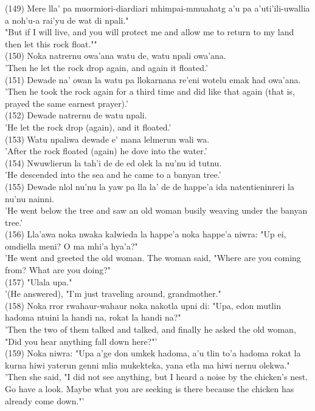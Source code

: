 \documentclass[10pt]{article}
\begin{document}
(149) Mere lla' pa muormiori-diardiari mhimpai-mmuahatg a'u pa a'uti'ili-uwallia a noh'u-a rai'yu de wat di npali."\\
"But if I will live, and you will protect me and allow me to return to my land then let this rock float.""\\
(150) Noka natrernu owa'ana watu de, watu npali owa'ana.\\
'Then he let the rock drop again, and again it floated.'\\
(151) Dewade na' owan la watu pa llokarnana re'eni wotelu emak had owa'ana.\\
'Then he took the rock again for a third time and did like that again (that is, prayed the same earnest prayer).'\\
(152) Dewade natrernu de watu npali.\\
'He let the rock drop (again), and it floated.'\\
(153) Watu npaliwa dewade e' mana lelmerun wali wa.\\
'After the rock floated (again) he dove into the water.'\\
(154) Nwuwlierun la tah'i de de ed olek la nu'nu id tutnu.\\
'He descended into the sea and he came to a banyan tree.'\\
(155) Dewade nlol nu'nu la yaw pa lla la' de de happe'a ida natentieninreri la nu'nu nainni.\\
'He went below the tree and saw an old woman busily weaving under the banyan tree.'\\
(156) Lla'awa noka nwaka kalwieda la happe'a noka happe'a niwra: "Up ei, omdiella meni? O ma mhi'a hya'a?"\\
'He went and greeted the old woman. The woman said, "Where are you coming from? What are you doing?"\\
(157) "Ulala upa."\\
'(He answered), "I'm just traveling around, grandmother."\\
(158) Noka rror rwahaur-wahaur noka nakotla upni di: "Upa, edon mutlin hadoma ntuini la handi na, rokat la handi na?"\\
'Then the two of them talked and talked, and finally he asked the old woman, "Did you hear anything fall down here?"'\\
(159) Noka niwra: "Upa a'ge don umkek hadoma, a'u tlin to'a hadoma rokat la kurna hiwi yaterun genni mlia mukekteka, yana etla ma hiwi nernu olekwa."\\
'Then she said, "I did not see anything, but I heard a noise by the chicken's nest. Go have a look. Maybe what you are seeking is there because the chicken has already come down."'\\
\end{document}
